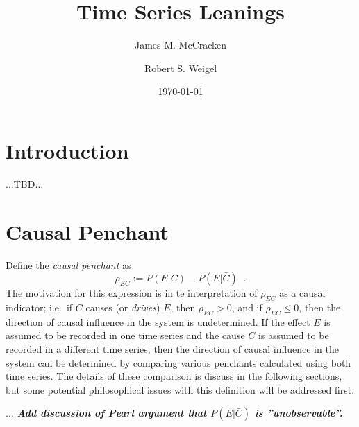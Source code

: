 \documentclass[a4paper,11pt,twocolumn]{article}
\begin{document}
\title{Time Series Leanings}
\author{James M. McCracken}
\author{Robert S. Weigel}
\date{\today}


\maketitle

\section{Introduction}
$\ldots$TBD$\ldots$

\section{Causal Penchant}
Define the {\em causal penchant} as
\begin{equation}
\label{eq:pen}
\rho_{EC} := P\left(E|C\right) - P\left(E|\bar{C}\right)\;\;.
\end{equation}
The motivation for this expression is in te interpretation of $\rho_{EC}$ as a causal indicator; i.e.\ if $C$ causes (or {\em drives}) $E$, then $\rho_{EC} > 0$, and if $\rho_{EC} \le 0$, then the direction of causal influence in the system is undetermined.  If the effect $E$ is assumed to be recorded in one time series and the cause $C$ is assumed to be recorded in a different time series, then the direction of causal influence in the system can be determined by comparing various penchants calculated using both time series.  The details of these comparison is discuss in the following sections, but some potential philosophical issues with this definition will be addressed first.

$\ldots$ {\em {\bf Add discussion of Pearl argument that $P(E|\bar{C})$ is ''unobservable''.}}
\end{document}
